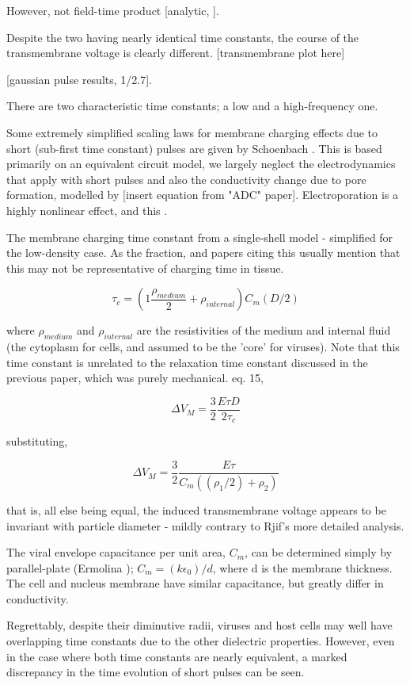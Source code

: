 \documentclass[fleqn,10pt]{paper}
\begin{document}
However, not field-time product [analytic, ]. 

Despite the two having nearly identical time constants, the course of the transmembrane voltage is clearly different.
[transmembrane plot here]

[gaussian pulse results, 1/2.7]. 


There are two characteristic time constants; a low and a high-frequency one.

Some extremely simplified scaling laws for membrane charging effects due to short (sub-first time constant) pulses are given by Schoenbach \cite{Bioelectric2007}. This is based primarily on an equivalent circuit model, we largely neglect the electrodynamics that apply with short pulses and also the conductivity change due to pore formation, modelled by [insert equation from "ADC" paper]. Electroporation is a highly nonlinear effect\cite{Letter1974}, and this .

The membrane charging time constant from a single-shell model \cite{Ultrashort2004} - simplified for the low-density case. As the fraction, and papers citing this usually mention that this may not be representative of charging time in tissue.

$$\tau_c = \left(1 \frac{\rho_{medium}}{2} + \rho_{internal}\right) C_m (D/2)$$

where $\rho_{medium}$ and $\rho_{internal}$ are the resistivities of the medium and internal fluid (the cytoplasm for cells, and assumed to be the 'core' for viruses). Note that this time constant is unrelated to the relaxation time constant discussed in the previous paper, which was purely mechanical. \cite{Bioelectric2007} eq. 15, 

$$\Delta V_M = \frac{3}{2}\frac{E\tau D}{2 \tau_c }$$

substituting,

$$\Delta V_M = \frac{3}{2}\frac{E \tau}{C_m ((\rho_1/2) + \rho_2)}$$

that is, all else being equal, the induced transmembrane voltage appears to be invariant with particle diameter - mildly contrary to Rjif's more detailed analysis.

The viral envelope capacitance per unit area, $C_m$, can be determined simply by parallel-plate (Ermolina \cite{Study2001}); $C_m = (k\epsilon_0) / d$, where d is the membrane thickness. The cell and nucleus membrane have similar capacitance, but greatly differ in conductivity. 

Regrettably, despite their diminutive radii, viruses and host cells may well have overlapping time constants due to the other dielectric properties. However, even in the case where both time constants are nearly equivalent, a marked discrepancy in the time evolution of short pulses can be seen.
\end{document}
